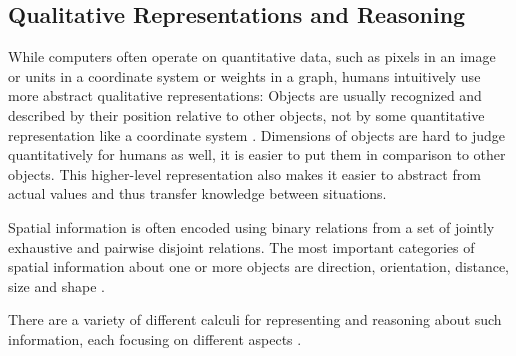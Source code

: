 \subsection{Qualitative Representations and Reasoning}
While computers often operate on quantitative data, such as pixels in an image or units in a coordinate system or weights in a graph, humans intuitively use more abstract qualitative representations: Objects are usually recognized and described by their position relative to other objects, not by some quantitative representation like a coordinate system \cite{forbus2019qualitative,human-qual-unknown}.
Dimensions of objects are hard to judge quantitatively for humans as well, it is easier to put them in comparison to other objects. This higher-level representation also makes it easier to abstract from actual values and thus transfer knowledge between situations.

Spatial information is often encoded using binary relations from a set of jointly exhaustive and pairwise disjoint relations. The most important categories of spatial information about one or more objects are direction, orientation, distance, size and shape \cite{Cohn2008QualitativeSR}.

There are a variety of different calculi for representing and reasoning about such information, each focusing on different aspects \cite{survey-https://doi.org/10.48550/arxiv.1606.00133}.


